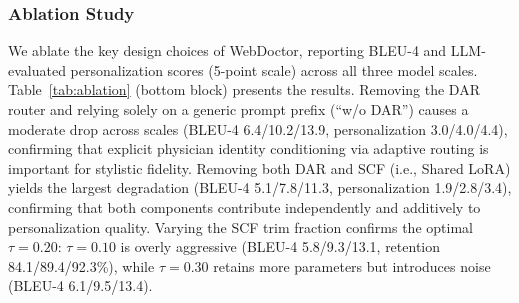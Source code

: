 \subsubsection{Ablation Study}
We ablate the key design choices of WebDoctor, reporting BLEU-4 and LLM-evaluated personalization scores (5-point scale) across all three model scales.
Table~\ref{tab:ablation} (bottom block) presents the results.
Removing the DAR router and relying solely on a generic prompt prefix (``w/o DAR'') causes a moderate drop across scales (BLEU-4 6.4/10.2/13.9, personalization 3.0/4.0/4.4), confirming that explicit physician identity conditioning via adaptive routing is important for stylistic fidelity.
Removing both DAR and SCF (i.e., Shared LoRA) yields the largest degradation (BLEU-4 5.1/7.8/11.3, personalization 1.9/2.8/3.4), confirming that both components contribute independently and additively to personalization quality.
Varying the SCF trim fraction confirms the optimal $\tau=0.20$: $\tau=0.10$ is overly aggressive (BLEU-4 5.8/9.3/13.1, retention 84.1/89.4/92.3\%), while $\tau=0.30$ retains more parameters but introduces noise (BLEU-4 6.1/9.5/13.4).


